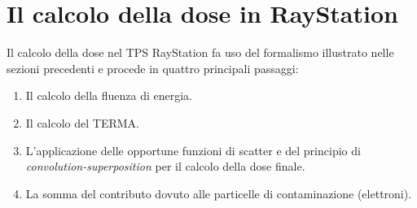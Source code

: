 {\section{Il calcolo della dose in RayStation}
\label{sec:algo_Ray}
Il calcolo della dose nel TPS RayStation fa uso del formalismo illustrato nelle sezioni precedenti e procede in quattro principali passaggi:
\begin{enumerate}
\item Il calcolo della fluenza di energia.
\item Il calcolo del TERMA.
\item L'applicazione delle opportune funzioni di scatter e del principio di \textit{convolution-superposition} per il calcolo della dose finale.
\item La somma del contributo dovuto alle particelle di contaminazione (elettroni).
\end{enumerate}

}
